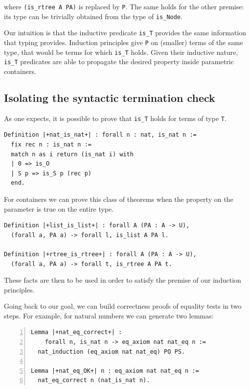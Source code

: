 \documentclass[sigplan,10pt,review]{acmart}\settopmatter{printfolios=true,printccs=false,printacmref=false}
\begin{document}
\noindent
where \lstinline+(is_rtree A PA)+ is replaced by \lstinline+P+.
The same holds for the other premise: its type can be trivially
obtained from the type of \lstinline+is_Node+.

Our intuition is that the inductive predicate \lstinline+is_T+
provides the same information that typing provides. Induction
principles give \lstinline+P+ on (smaller) terms of the same type,
that would be terms for which \lstinline+is_T+ holds.
Given their inductive nature, \lstinline+is_T+ predicates
are able to propagate the desired property inside parametric
containers.

\subsection{Isolating the syntactic termination check} %
\label{sec:idea:transparent}

As one expects, it is possible to prove that \lstinline+is_T+
holds for terms of type \lstinline+T+.

\begin{minipage}{\textwidth}\begin{lstlisting}
Definition |+nat_is_nat+| : forall n : nat, is_nat n :=
  fix rec n : is_nat n :=
  match n as i return (is_nat i) with
  | 0 => is_O
  | S p => is_S p (rec p)
  end.
\end{lstlisting}\end{minipage}

\noindent
For containers we can prove this class of theorems
when the property on the
parameter is true on the entire type.

\begin{minipage}{\textwidth}\begin{lstlisting}
Definition |+list_is_list+| : forall A (PA : A -> U),
  (forall a, PA a) -> forall l, is_list A PA l.

Definition |+rtree_is_rtree+| : forall A (PA : A -> U),
  (forall a, PA a) -> forall t, is_rtree A PA t.
\end{lstlisting}\end{minipage}

\noindent
These facts are then to be used in order to satisfy the
premise of our induction principles. 

Going back to our goal, we can build correctness
proofs of equality tests in two steps.
For example, for natural numbers we can generate two
lemmas:

\begin{minipage}{\textwidth}\begin{lstlisting}[numbers=left]
Lemma |+nat_eq_correct+| :
    forall n, is_nat n -> eq_axiom nat nat_eq n :=
  nat_induction (eq_axiom nat nat_eq) PO PS.

Lemma |+nat_eq_OK+| n : eq_axiom nat nat_eq n :=
  nat_eq_correct n (nat_is_nat n).
\end{lstlisting}\end{minipage}
\end{document}
